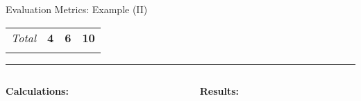 \begin{frame}{Evaluation Metrics: Example (II)}
\begin{center}
\begin{tabular}{lp{1cm}p{1cm}p{1cm}p{1cm}}
			\multicolumn{2}{r|}{\textit{Total}}                        & \multicolumn{1}{c}{\textbf{4}}                               & \multicolumn{1}{c|}{\textbf{6}}                                                                                                        & \multicolumn{1}{c}{\textbf{10}}                                                                                                                                                                                                                                      \\
			                                                           &                                                              &                                                                                                                                        &                                                                                                                                   &
		\end{tabular}
	\end{center}

	\vspace*{-0.25cm}

	\rule{\textwidth}{0.4pt}

	\vspace*{-0.25cm}

	\begin{columns}
		\begin{column}{0.45\textwidth}
			\begin{center}
				\textbf{Calculations:}
			\end{center}
		\end{column}
		\begin{column}{0.45\textwidth}
			\begin{center}
				\textbf{Results:}
			\end{center}
		\end{column}
	\end{columns}

	\vspace*{-0.05cm}


\end{frame}
